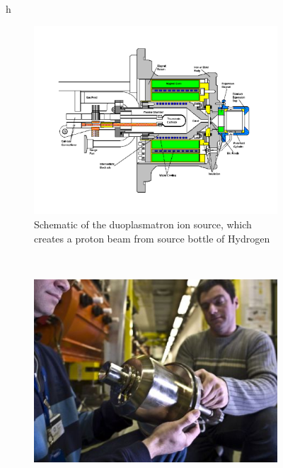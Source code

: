 \begin{figure}{h}
    \centering
    \begin{subfigure}[h]{0.4\textwidth}
        \includegraphics[width=\textwidth]{Figures/LHC_Diagrams/LHC__Linac2__Duoplasmatron_Schematic.pdf}
        \caption{Schematic of the duoplasmatron ion source, which
          creates a proton beam from source bottle of Hydrogen \cite{LHC:LHC_linac2_duoplasmatron_schematic}}\label{fig:duoplasmatron_schematic}
      \end{subfigure}
      ~ %
      \begin{subfigure}[h]{0.4\textwidth}
        \includegraphics[width=\textwidth]{Figures/LHC_Diagrams/LHC__Linac2__Duoplasmatron__CF002521-ProtonSourceDuoplasmatronRichardChristianss.jpg}

\end{subfigure}
\end{figure}
